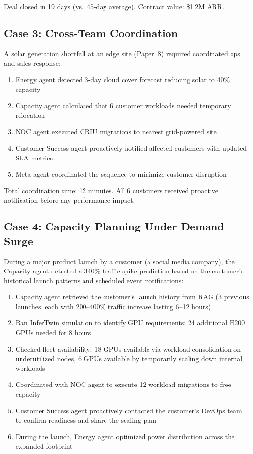 \documentclass[conference,10pt,letterpaper]{IEEEtran}
\begin{document}
Deal closed in 19 days (vs.\ 45-day average). Contract value: \$1.2M ARR.

\subsection{Case 3: Cross-Team Coordination}

A solar generation shortfall at an edge site (Paper~8) required coordinated ops and sales response:

\begin{enumerate}
\item Energy agent detected 3-day cloud cover forecast reducing solar to 40\% capacity
\item Capacity agent calculated that 6 customer workloads needed temporary relocation
\item NOC agent executed CRIU migrations to nearest grid-powered site
\item Customer Success agent proactively notified affected customers with updated SLA metrics
\item Meta-agent coordinated the sequence to minimize customer disruption
\end{enumerate}

Total coordination time: 12 minutes. All 6 customers received proactive notification before any performance impact.




\subsection{Case 4: Capacity Planning Under Demand Surge}

During a major product launch by a customer (a social media company), the Capacity agent detected a 340\% traffic spike prediction based on the customer's historical launch patterns and scheduled event notifications:

\begin{enumerate}
\item Capacity agent retrieved the customer's launch history from RAG (3 previous launches, each with 200--400\% traffic increase lasting 6--12 hours)
\item Ran InferTwin simulation to identify GPU requirements: 24 additional H200 GPUs needed for 8 hours
\item Checked fleet availability: 18 GPUs available via workload consolidation on underutilized nodes, 6 GPUs available by temporarily scaling down internal workloads
\item Coordinated with NOC agent to execute 12 workload migrations to free capacity
\item Customer Success agent proactively contacted the customer's DevOps team to confirm readiness and share the scaling plan
\item During the launch, Energy agent optimized power distribution across the expanded footprint
\end{enumerate}
\end{document}
